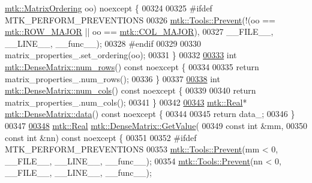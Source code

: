 \begin{DoxyCode}
      \hyperlink{group__c02-enums_ga622801bd9f912d0f976c3e383f5f581c}{mtk::MatrixOrdering} oo) noexcept \{
00324 
00325 \textcolor{preprocessor}{  #ifdef MTK\_PERFORM\_PREVENTIONS}
00326   \hyperlink{classmtk_1_1Tools_a332324c6f25e66be9dff48c5987a3b9f}{mtk::Tools::Prevent}(!(oo == \hyperlink{namespacemtk_ga622801bd9f912d0f976c3e383f5f581cabc55178ac16eb1ce89b5f3ab915a91f3}{mtk::ROW\_MAJOR} || oo == 
      \hyperlink{namespacemtk_ga622801bd9f912d0f976c3e383f5f581ca7c11989c132253fb76b8f6b1314f7e13}{mtk::COL\_MAJOR}),
00327                       \_\_FILE\_\_, \_\_LINE\_\_, \_\_func\_\_);
00328 \textcolor{preprocessor}{  #endif}
00329 
00330   matrix\_properties\_.set\_ordering(oo);
00331 \}
00332 
\hypertarget{mtk__dense__matrix_8cc_source_l00333}{}\hyperlink{classmtk_1_1DenseMatrix_a53f3afb3b6a8d21854458aaa9663cc74}{00333} \textcolor{keywordtype}{int} \hyperlink{classmtk_1_1DenseMatrix_a53f3afb3b6a8d21854458aaa9663cc74}{mtk::DenseMatrix::num\_rows}() const noexcept \{
00334 
00335   \textcolor{keywordflow}{return} matrix\_properties\_.num\_rows();
00336 \}
00337 
\hypertarget{mtk__dense__matrix_8cc_source_l00338}{}\hyperlink{classmtk_1_1DenseMatrix_a41747502d468c6728a4be31501b16e0e}{00338} \textcolor{keywordtype}{int} \hyperlink{classmtk_1_1DenseMatrix_a41747502d468c6728a4be31501b16e0e}{mtk::DenseMatrix::num\_cols}() const noexcept \{
00339 
00340   \textcolor{keywordflow}{return} matrix\_properties\_.num\_cols();
00341 \}
00342 
\hypertarget{mtk__dense__matrix_8cc_source_l00343}{}\hyperlink{classmtk_1_1DenseMatrix_a0c33b8a9e01d157c61ddbdf807c25d84}{00343} \hyperlink{group__c01-roots_gac080bbbf5cbb5502c9f00405f894857d}{mtk::Real}* \hyperlink{classmtk_1_1DenseMatrix_a0c33b8a9e01d157c61ddbdf807c25d84}{mtk::DenseMatrix::data}() const noexcept \{
00344 
00345   \textcolor{keywordflow}{return} data\_;
00346 \}
00347 
\hypertarget{mtk__dense__matrix_8cc_source_l00348}{}\hyperlink{classmtk_1_1DenseMatrix_a4b23ecbebd970b5eea915dbb50691024}{00348} \hyperlink{group__c01-roots_gac080bbbf5cbb5502c9f00405f894857d}{mtk::Real} \hyperlink{classmtk_1_1DenseMatrix_a4b23ecbebd970b5eea915dbb50691024}{mtk::DenseMatrix::GetValue}(
00349     \textcolor{keyword}{const} \textcolor{keywordtype}{int} &mm,
00350     \textcolor{keyword}{const} \textcolor{keywordtype}{int} &nn) \textcolor{keyword}{const} noexcept \{
00351 
00352 \textcolor{preprocessor}{  #ifdef MTK\_PERFORM\_PREVENTIONS}
00353   \hyperlink{classmtk_1_1Tools_a332324c6f25e66be9dff48c5987a3b9f}{mtk::Tools::Prevent}(mm < 0, \_\_FILE\_\_, \_\_LINE\_\_, \_\_func\_\_);
00354   \hyperlink{classmtk_1_1Tools_a332324c6f25e66be9dff48c5987a3b9f}{mtk::Tools::Prevent}(nn < 0, \_\_FILE\_\_, \_\_LINE\_\_, \_\_func\_\_);

\end{DoxyCode}
